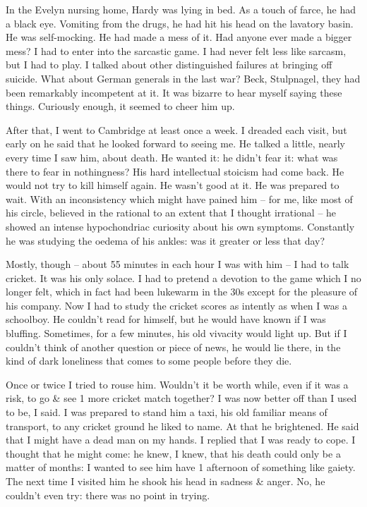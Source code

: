 \documentclass{article}
\numberwithin{equation}{section}
\begin{document}
In the Evelyn nursing home, Hardy was lying in bed. As a touch of farce, he had a black eye. Vomiting from the drugs, he had hit his head on the lavatory basin. He was self-mocking. He had made a mess of it. Had anyone ever made a bigger mess? I had to enter into the sarcastic game. I had never felt less like sarcasm, but I had to play. I talked about other distinguished failures at bringing off suicide. What about German generals in the last war? Beck, Stulpnagel, they had been remarkably incompetent at it. It was bizarre to hear myself saying these things. Curiously enough, it seemed to cheer him up.

After that, I went to Cambridge at least once a week. I dreaded each visit, but early on he said that he looked forward to seeing me. He talked a little, nearly every time I saw him, about death. He wanted it: he didn't fear it: what was there to fear in nothingness? His hard intellectual stoicism had come back. He would not try to kill himself again. He wasn't good at it. He was prepared to wait. With an inconsistency which might have pained him -- for me, like most of his circle, believed in the rational to an extent that I thought irrational -- he showed an intense hypochondriac curiosity about his own symptoms. Constantly he was studying the oedema of his ankles: was it greater or less that day?

Mostly, though -- about 55 minutes in each hour I was with him -- I had to talk cricket. It was his only solace. I had to pretend a devotion to the game which I no longer felt, which in fact had been lukewarm in the 30s except for the pleasure of his company. Now I had to study the cricket scores as intently as when I was a schoolboy. He couldn't read for himself, but he would have known if I was bluffing. Sometimes, for a few minutes, his old vivacity would light up. But if I couldn't think of another question or piece of news, he would lie there, in the kind of dark loneliness that comes to some people before they die.

Once or twice I tried to rouse him. Wouldn't it be worth while, even if it was a risk, to go \& see 1 more cricket match together? I was now better off than I used to be, I said. I was prepared to stand him a taxi, his old familiar means of transport, to any cricket ground he liked to name. At that he brightened. He said that I might have a dead man on my hands. I replied that I was ready to cope. I thought that he might come: he knew, I knew, that his death could only be a matter of months: I wanted to see him have 1 afternoon of something like gaiety. The next time I visited him he shook his head in sadness \& anger. No, he couldn't even try: there was no point in trying.
\end{document}

